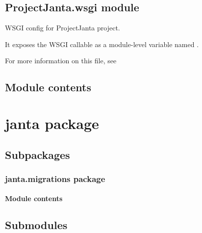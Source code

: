 \documentclass[letterpaper,10pt,english]{sphinxmanual}
\begin{document}
\subsection{ProjectJanta.wsgi module}
\label{\detokenize{ProjectJanta:module-ProjectJanta.wsgi}}\label{\detokenize{ProjectJanta:projectjanta-wsgi-module}}
WSGI config for ProjectJanta project.

It exposes the WSGI callable as a module-level variable named .

For more information on this file, see


\subsection{Module contents}
\label{\detokenize{ProjectJanta:module-ProjectJanta}}\label{\detokenize{ProjectJanta:module-contents}}

\section{janta package}
\label{\detokenize{janta:janta-package}}\label{\detokenize{janta::doc}}

\subsection{Subpackages}
\label{\detokenize{janta:subpackages}}

\subsubsection{janta.migrations package}
\label{\detokenize{janta.migrations:janta-migrations-package}}\label{\detokenize{janta.migrations::doc}}

\paragraph{Module contents}
\label{\detokenize{janta.migrations:module-janta.migrations}}\label{\detokenize{janta.migrations:module-contents}}

\subsection{Submodules}
\label{\detokenize{janta:submodules}}
\end{document}
